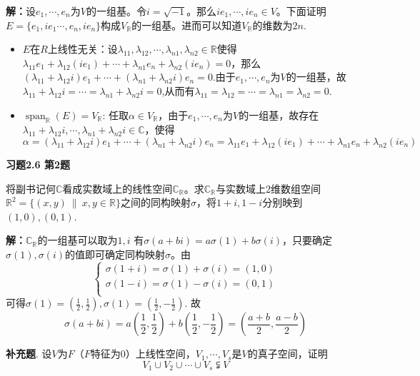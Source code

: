 {\bf 解：}设$e_1,\cdots,e_n$为$V$的一组基。令$i=\sqrt{-1}$。那么$ie_1,\cdots,ie_n\in V$。下面证明$E = \{ e_1,ie_1\cdots,e_n,ie_n\}$构成$V_{\mathbb{R}}$的一组基。进而可以知道$V_{\mathbb{R}}$的维数为$2n$.
\begin{itemize}
\item $E$在$R$上线性无关：设$\lambda_{11},\lambda_{12},\cdots,\lambda_{n1},\lambda_{n2}\in\mathbb{R}$使得$\lambda_{11}e_1+\lambda_{12}(ie_1)+\cdots+\lambda_{n1}e_n+\lambda_{n2}(ie_n) = 0$，那么$(\lambda_{11}+\lambda_{12}i)e_1+\cdots+(\lambda_{n1}+\lambda_{n2}i)e_n = 0$.由于$e_1,\cdots,e_n$为$V$的一组基，故$\lambda_{11}+\lambda_{12}i=\cdots=\lambda_{n1}+\lambda_{n2}i=0$,从而有$\lambda_{11}=\lambda_{12}=\cdots=\lambda_{n1}=\lambda_{n2}=0$.
\item $\operatorname{span}_{\mathbb{R}}(E) = V_{\mathbb{R}}$: 任取$\alpha\in V_{\mathbb{R}}$，由于$e_1,\cdots,e_n$为$V$的一组基，故存在$\lambda_{11}+\lambda_{12}i,\cdots,\lambda_{n1}+\lambda_{n2}i\in\mathbb{C}$，使得
$$\alpha = (\lambda_{11}+\lambda_{12}i)e_1 + \cdots + (\lambda_{n1}+\lambda_{n2}i)e_n = \lambda_{11}e_1+\lambda_{12}(ie_1) + \cdots + \lambda_{n1}e_n+\lambda_{n2}(ie_n)$$
\end{itemize}

\newpageorvspace

{\bf 习题2.6 第2题}

将副书记何$\mathbb{C}$看成实数域上的线性空间$\mathbb{C}_{\mathbb{R}}$。求$\mathbb{C}_{\mathbb{R}}$与实数域上2维数组空间$\mathbb{R}^2 = \{ (x,y) \ \|\ x,y\in\mathbb{R} \}$之间的同构映射$\sigma$，将$1+i,1-i$分别映到$(1,0), (0,1)$.

{\bf 解：}$\mathbb{C}_{\mathbb{R}}$的一组基可以取为$1,i$ 有$\sigma(a+bi) = a\sigma(1) + b\sigma(i)$，只要确定$\sigma(1), \sigma(i)$的值即可确定同构映射$\sigma$。由
$$
\begin{cases}
\sigma(1+i) = \sigma(1) + \sigma(i) =(1,0) \\
\sigma(1-i) = \sigma(1) - \sigma(i) =(0,1) \\
\end{cases}
$$
可得$\sigma(1) = \left(\frac{1}{2}, \frac{1}{2}\right), \sigma(1) = \left(\frac{1}{2}, -\frac{1}{2}\right)$. 故
$$\sigma(a+bi) = a \left( \frac{1}{2}, \frac{1}{2} \right) + b \left( \frac{1}{2}, -\frac{1}{2} \right) = \left( \frac{a+b}{2}, \frac{a-b}{2} \right)$$

\newpageorvspace

{\bf 补充题}. 设$V$为$F$（$F$特征为0）上线性空间，$V_1,\cdots,V_s$是$V$的真子空间，证明
$$V_1\cup V_2\cup \cdots \cup V_s \subsetneqq V$$

